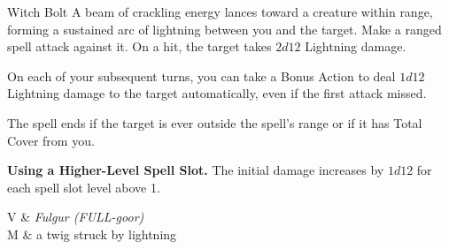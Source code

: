 \begin{Spell}[
    tags=Concentration,
    level=1st,
    time=1 Action,
    range=60 ft,
    components={V, S, M},
    duration=1 Minute,
    school=Evocation,
    attack=Ranged,
    effect=Lightning
]{Witch Bolt}
A beam of crackling energy lances toward a creature within range, forming a sustained arc of lightning between you and the target. Make a ranged spell attack against it. On a hit, the target takes $2d12$ Lightning damage.

On each of your subsequent turns, you can take a Bonus Action to deal $1d12$ Lightning damage to the target automatically, even if the first attack missed.

The spell ends if the target is ever outside the spell's range or if it has Total Cover from you.

\textbf{Using a Higher-Level Spell Slot.} The initial damage increases by $1d12$ for each spell slot level above 1.

\begin{components}
V & \textit{Fulgur (FULL-goor)} \\
M & a twig struck by lightning
\end{components}
\end{Spell}
